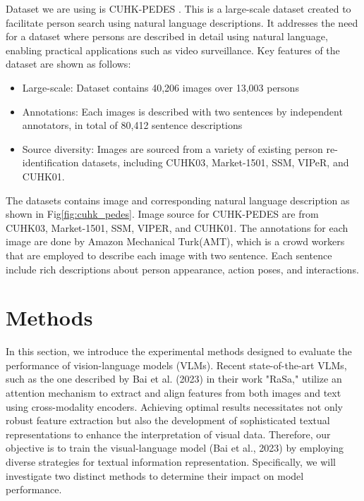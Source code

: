 Dataset we are using is CUHK-PEDES \cite{li2017personsearchnaturallanguage}. This is a large-scale dataset created to facilitate person search using natural language descriptions. It addresses the need for a dataset where persons are described in detail using natural language, enabling practical applications such as video surveillance. Key features of the dataset are shown as follows:
\begin{itemize}
  \item Large-scale: Dataset contains 40,206 images over 13,003 persons 
  \item Annotations: Each images is described with two sentences by independent annotators, in total of 80,412 sentence descriptions
  \item Source diversity: Images are sourced from a variety of existing person re-identification datasets, including CUHK03\cite{li2014deepreid}, Market-1501\cite{7410490}, SSM\cite{ssm}, VIPeR\cite{viper}, and CUHK01\cite{li2012human}.
\end{itemize}

The datasets contains image and corresponding natural language description as shown in Fig\ref{fig:cuhk_pedes}. Image source for CUHK-PEDES are from CUHK03, Market-1501, SSM, VIPER, and CUHK01. The annotations for each image are done by Amazon Mechanical Turk(AMT), which is a crowd workers that are employed to describe each image with two sentence. Each sentence include rich descriptions about person appearance, action poses, and interactions.


\section{Methods}
In this section, we introduce the experimental methods designed to evaluate the performance of vision-language models (VLMs). Recent state-of-the-art VLMs, such as the one described by Bai et al. (2023) in their work "RaSa," utilize an attention mechanism to extract and align features from both images and text using cross-modality encoders. Achieving optimal results necessitates not only robust feature extraction but also the development of sophisticated textual representations to enhance the interpretation of visual data. Therefore, our objective is to train the visual-language model (Bai et al., 2023) by employing diverse strategies for textual information representation. Specifically, we will investigate two distinct methods to determine their impact on model performance.


